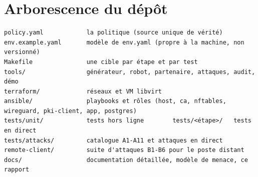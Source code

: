 \documentclass[11pt,a4paper]{article}
\begin{document}
\section{Arborescence du dépôt}
\begin{lstlisting}
policy.yaml            la politique (source unique de vérité)
env.example.yaml       modèle de env.yaml (propre à la machine, non versionné)
Makefile               une cible par étape et par test
tools/                 générateur, robot, partenaire, attaques, audit, démo
terraform/             réseaux et VM libvirt
ansible/               playbooks et rôles (host, ca, nftables, wireguard, pki-client, app, postgres)
tests/unit/            tests hors ligne        tests/<étape>/   tests en direct
tests/attacks/         catalogue A1-A11 et attaques en direct
remote-client/         suite d'attaques B1-B6 pour le poste distant
docs/                  documentation détaillée, modèle de menace, ce rapport
\end{lstlisting}
\end{document}
